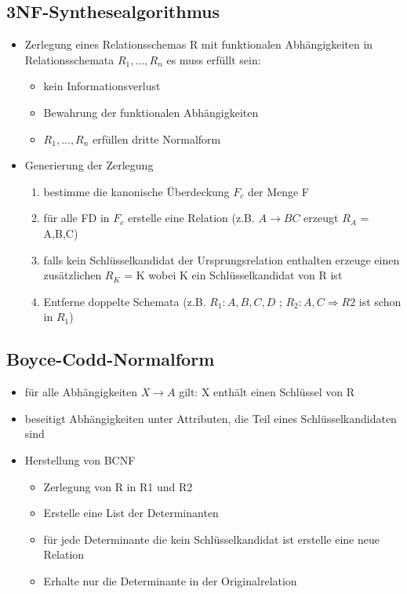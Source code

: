 \documentclass[a4paper]{article}
\begin{document}
\subsection{3NF-Synthesealgorithmus}
\begin{itemize}
    \item Zerlegung eines Relationsschemas R mit funktionalen Abhängigkeiten in Relationsschemata $R_1, ... ,R_n$ es muss erfüllt sein:
    \begin{itemize}
        \item kein Informationsverlust
        \item Bewahrung der funktionalen Abhängigkeiten
        \item $R_1 , ... ,R_n $ erfüllen dritte Normalform
    \end{itemize}
    \item Generierung der Zerlegung
    \begin{enumerate}
        \item bestimme die kanonische Überdeckung $F_c$ der Menge F
        \item für alle FD in $F_c$ erstelle eine Relation (z.B. $A \to BC$ erzeugt $R_A$ = {A,B,C})
        \item falls kein Schlüsselkandidat der Ursprungsrelation enthalten erzeuge einen zusätzlichen $R_K$ = K wobei K ein Schlüsselkandidat von R ist
        \item Entferne doppelte Schemata (z.B. $R_1:{A,B,C,D}$ ; $R_2:{A,C} \Rightarrow R2$ ist schon in $R_1$)
    \end{enumerate}
\end{itemize}

\subsection{Boyce-Codd-Normalform}
\begin{itemize}
    \item für alle Abhängigkeiten $X \to A$ gilt: X enthält einen Schlüssel von R
    \item beseitigt Abhängigkeiten unter Attributen, die Teil eines Schlüsselkandidaten sind
    \item Herstellung von BCNF
    \begin{itemize}
        \item Zerlegung von R in R1 und R2
        \item Erstelle eine List der Determinanten
        \item für jede Determinante die kein Schlüsselkandidat ist erstelle eine neue Relation
        \item Erhalte nur die Determinante in der Originalrelation
    \end{itemize}
\end{itemize}
\end{document}
